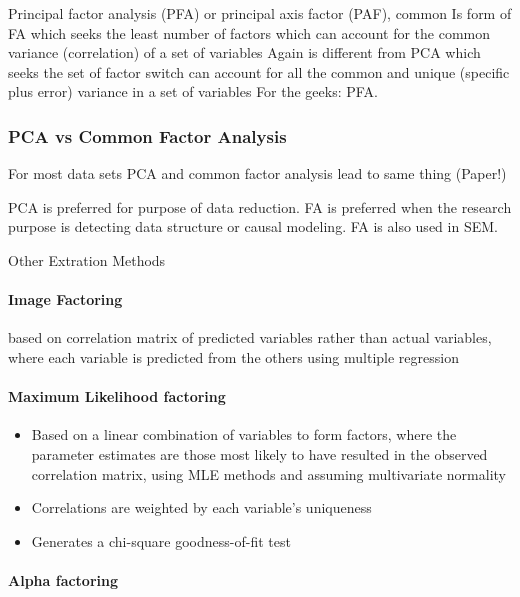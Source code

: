 \documentclass[]{book}
\providecommand{\tightlist}{%
  \setlength{\itemsep}{0pt}\setlength{\parskip}{0pt}}
\let\oldparagraph\paragraph
\renewcommand{\paragraph}[1]{\oldparagraph{#1}\mbox{}}
\theoremstyle{definition}
\theoremstyle{definition}
\theoremstyle{definition}
\theoremstyle{remark}
\begin{document}
Principal factor analysis (PFA) or principal axis factor (PAF), common
Is form of FA which seeks the least number of factors which can account
for the common variance (correlation) of a set of variables Again is
different from PCA which seeks the set of factor switch can account for
all the common and unique (specific plus error) variance in a set of
variables For the geeks: PFA.

\subsubsection{PCA vs Common Factor
Analysis}\label{pca-vs-common-factor-analysis}

For most data sets PCA and common factor analysis lead to same thing
(Paper!)

PCA is preferred for purpose of data reduction. FA is preferred when the
research purpose is detecting data structure or causal modeling. FA is
also used in SEM.

Other Extration Methods

\paragraph{Image Factoring}\label{image-factoring}

based on correlation matrix of predicted variables rather than actual
variables, where each variable is predicted from the others using
multiple regression

\paragraph{Maximum Likelihood
factoring}\label{maximum-likelihood-factoring}

\begin{itemize}
\tightlist
\item
  Based on a linear combination of variables to form factors, where the
  parameter estimates are those most likely to have resulted in the
  observed correlation matrix, using MLE methods and assuming
  multivariate normality
\item
  Correlations are weighted by each variable's uniqueness
\item
  Generates a chi-square goodness-of-fit test
\end{itemize}

\paragraph{Alpha factoring}\label{alpha-factoring}
\end{document}
